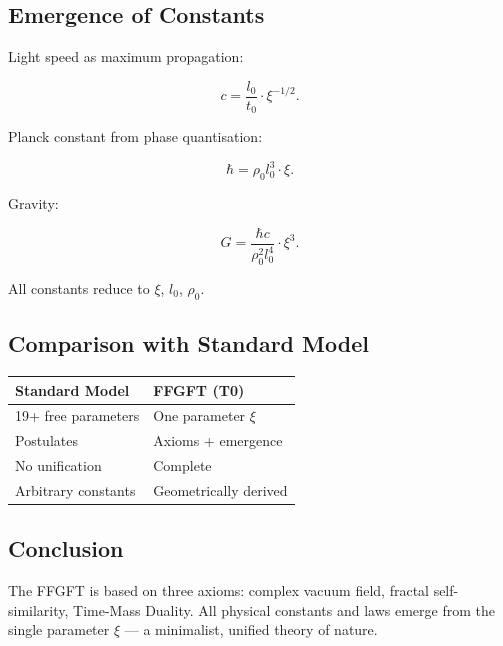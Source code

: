 	\subsection*{Emergence of Constants}
	
	Light speed as maximum propagation:
	
	\begin{equation}
		c = \frac{l_0}{t_0} \cdot \xi^{-1/2}.
	\end{equation}
	
	Planck constant from phase quantisation:
	
	\begin{equation}
		\hbar = \rho_0 l_0^3 \cdot \xi.
	\end{equation}
	
	Gravity:
	
	\begin{equation}
		G = \frac{\hbar c}{\rho_0^2 l_0^4} \cdot \xi^3.
	\end{equation}
	
	All constants reduce to \(\xi\), \(l_0\), \(\rho_0\).
	
	\subsection*{Comparison with Standard Model}
	
	\begin{center}
		\begin{tabular}{p{}p{}}
			\textbf{Standard Model} & \textbf{FFGFT (T0)} \\
			\hline
			19+ free parameters & One parameter \(\xi\) \\
			Postulates & Axioms + emergence \\
			No unification & Complete \\
			Arbitrary constants & Geometrically derived \\
		\end{tabular}
	\end{center}
	
	\subsection*{Conclusion}
	
	The FFGFT is based on three axioms: complex vacuum field, fractal self-similarity, Time-Mass Duality. All physical constants and laws emerge from the single parameter \(\xi\) — a minimalist, unified theory of nature.



